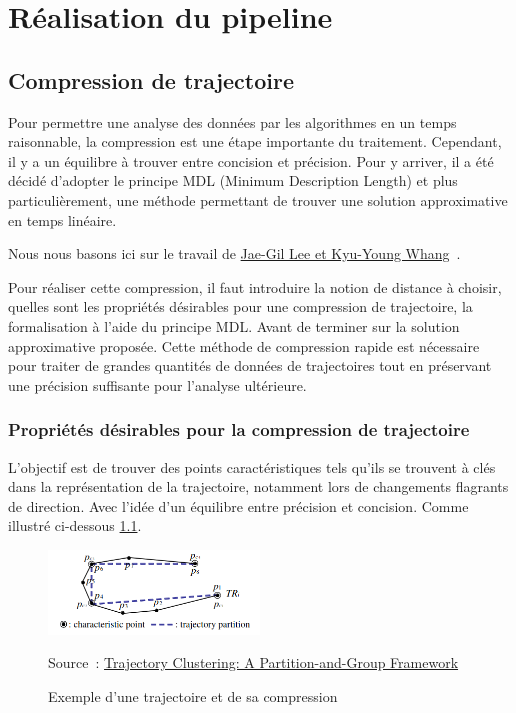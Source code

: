 \setlength{\columnsep}{0.6cm}
\chapter{Réalisation du pipeline}



\section{Compression de trajectoire}
\label{compression}

Pour permettre une analyse des données par les algorithmes en un temps raisonnable, la compression est une étape importante du traitement. Cependant, il y a un équilibre à trouver entre concision et précision. Pour y arriver, il a été décidé d'adopter le principe MDL (Minimum Description Length) et plus particulièrement, une méthode permettant de trouver une solution approximative en temps linéaire.

Nous nous basons ici sur le travail de \href{https://hanj.cs.illinois.edu/pdf/sigmod07_jglee.pdf}{Jae-Gil Lee et Kyu-Young Whang}~\cite{lee2007trajectory}. 

Pour réaliser cette compression, il faut introduire la notion de distance à choisir, quelles sont les propriétés désirables pour une compression de trajectoire, la formalisation à l'aide du principe MDL. Avant de terminer sur la solution approximative proposée. Cette méthode de compression rapide est nécessaire pour traiter de grandes quantités de données de trajectoires tout en préservant une précision suffisante pour l'analyse ultérieure.

\subsection{Propriétés désirables pour la compression de trajectoire}

L'objectif est de trouver des points caractéristiques tels qu'ils se trouvent à clés dans la représentation de la trajectoire, notamment lors de changements flagrants de direction. Avec l'idée d'un équilibre entre précision et concision. Comme illustré ci-dessous \ref{fig:mdlcost}.

\begin{figure}[ht]
    \centering
    \includegraphics[width=0.5\textwidth]{Images/compressionExample.png}
    \caption{Exemple d'une trajectoire et de sa compression}
    \label{fig:mdlcost}
    Source : \href{https://hanj.cs.illinois.edu/pdf/sigmod07_jglee.pdf}{Trajectory Clustering: A Partition-and-Group Framework}
\end{figure}

